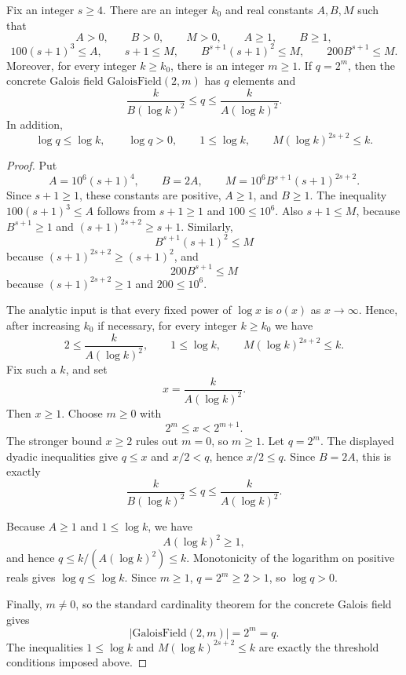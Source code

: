 \begin{helper}
Fix an integer \(s\ge4\).  There are an integer \(k_0\) and real constants
\(A,B,M\) such that
\[
  A>0,\qquad B>0,\qquad M>0,\qquad A\ge1,\qquad B\ge1,
\]
\[
  100(s+1)^3\le A,\qquad s+1\le M,\qquad
  B^{s+1}(s+1)^2\le M,\qquad 200B^{s+1}\le M.
\]
Moreover, for every integer \(k\ge k_0\), there is an integer \(m\ge1\).
If \(q=2^m\), then the concrete Galois field
\(\mathrm{GaloisField}(2,m)\) has \(q\) elements and
\[
  \frac{k}{B(\log k)^2}\le q\le \frac{k}{A(\log k)^2}.
\]
In addition,
\[
  \log q\le \log k,\qquad \log q>0,\qquad
  1\le \log k,\qquad M(\log k)^{2s+2}\le k.
\]
\end{helper}
\begin{proof}
Put
\[
  A=10^6(s+1)^4,\qquad B=2A,\qquad
  M=10^6B^{s+1}(s+1)^{2s+2}.
\]
Since \(s+1\ge1\), these constants are positive, \(A\ge1\), and \(B\ge1\).
The inequality \(100(s+1)^3\le A\) follows from \(s+1\ge1\) and
\(100\le10^6\).  Also \(s+1\le M\), because \(B^{s+1}\ge1\) and
\((s+1)^{2s+2}\ge s+1\).  Similarly,
\[
  B^{s+1}(s+1)^2\le M
\]
because \((s+1)^{2s+2}\ge (s+1)^2\), and
\[
  200B^{s+1}\le M
\]
because \((s+1)^{2s+2}\ge1\) and \(200\le10^6\).

The analytic input is that every fixed power of \(\log x\) is
\(o(x)\) as \(x\to\infty\).  Hence, after increasing \(k_0\) if necessary,
for every integer \(k\ge k_0\) we have
\[
  2\le \frac{k}{A(\log k)^2},\qquad
  1\le\log k,\qquad
  M(\log k)^{2s+2}\le k.
\]
Fix such a \(k\), and set
\[
  x=\frac{k}{A(\log k)^2}.
\]
Then \(x\ge1\).  Choose \(m\ge0\) with
\[
  2^m\le x<2^{m+1}.
\]
The stronger bound \(x\ge2\) rules out \(m=0\), so \(m\ge1\).  Let
\(q=2^m\).  The displayed dyadic inequalities give \(q\le x\) and
\(x/2<q\), hence \(x/2\le q\).  Since \(B=2A\), this is exactly
\[
  \frac{k}{B(\log k)^2}\le q\le \frac{k}{A(\log k)^2}.
\]

Because \(A\ge1\) and \(1\le\log k\), we have
\[
  A(\log k)^2\ge1,
\]
and hence \(q\le k/(A(\log k)^2)\le k\).  Monotonicity of the logarithm on
positive reals gives \(\log q\le\log k\).  Since \(m\ge1\), \(q=2^m\ge2>1\),
so \(\log q>0\).

Finally, \(m\ne0\), so the standard cardinality theorem for the concrete
Galois field gives
\[
  |\mathrm{GaloisField}(2,m)|=2^m=q.
\]
The inequalities \(1\le\log k\) and \(M(\log k)^{2s+2}\le k\) are exactly
the threshold conditions imposed above.
\end{proof}

